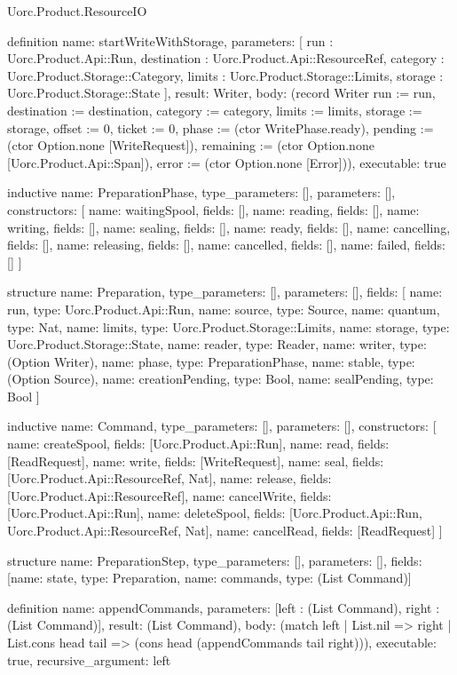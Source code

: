 \begin{lexlean}{Uorc.Product.ResourceIO}
\begin{semanticmodule}
definition{
  name: startWriteWithStorage,
  parameters: [
    run : Uorc.Product.Api::Run,
    destination : Uorc.Product.Api::ResourceRef,
    category : Uorc.Product.Storage::Category,
    limits : Uorc.Product.Storage::Limits,
    storage : Uorc.Product.Storage::State
  ],
  result: Writer,
  body: (record Writer {run := run, destination := destination, category := category, limits := limits, storage := storage, offset := 0, ticket := 0, phase := (ctor WritePhase.ready), pending := (ctor Option.none [WriteRequest]), remaining := (ctor Option.none [Uorc.Product.Api::Span]), error := (ctor Option.none [Error])}),
  executable: true
}

inductive{
  name: PreparationPhase,
  type_parameters: [],
  parameters: [],
  constructors: [
    {name: waitingSpool, fields: []},
    {name: reading, fields: []},
    {name: writing, fields: []},
    {name: sealing, fields: []},
    {name: ready, fields: []},
    {name: cancelling, fields: []},
    {name: releasing, fields: []},
    {name: cancelled, fields: []},
    {name: failed, fields: []}
  ]
}

structure{
  name: Preparation,
  type_parameters: [],
  parameters: [],
  fields: [
    {name: run, type: Uorc.Product.Api::Run},
    {name: source, type: Source},
    {name: quantum, type: Nat},
    {name: limits, type: Uorc.Product.Storage::Limits},
    {name: storage, type: Uorc.Product.Storage::State},
    {name: reader, type: Reader},
    {name: writer, type: (Option Writer)},
    {name: phase, type: PreparationPhase},
    {name: stable, type: (Option Source)},
    {name: creationPending, type: Bool},
    {name: sealPending, type: Bool}
  ]
}

inductive{
  name: Command,
  type_parameters: [],
  parameters: [],
  constructors: [
    {name: createSpool, fields: [Uorc.Product.Api::Run]},
    {name: read, fields: [ReadRequest]},
    {name: write, fields: [WriteRequest]},
    {name: seal, fields: [Uorc.Product.Api::ResourceRef, Nat]},
    {name: release, fields: [Uorc.Product.Api::ResourceRef]},
    {name: cancelWrite, fields: [Uorc.Product.Api::Run]},
    {name: deleteSpool, fields: [Uorc.Product.Api::Run, Uorc.Product.Api::ResourceRef, Nat]},
    {name: cancelRead, fields: [ReadRequest]}
  ]
}

structure{
  name: PreparationStep,
  type_parameters: [],
  parameters: [],
  fields: [{name: state, type: Preparation}, {name: commands, type: (List Command)}]
}

definition{
  name: appendCommands,
  parameters: [left : (List Command), right : (List Command)],
  result: (List Command),
  body: (match left
    | List.nil => right
    | List.cons head tail => (cons head (appendCommands tail right))),
  executable: true,
  recursive_argument: left
}


\end{semanticmodule}
\end{lexlean}
